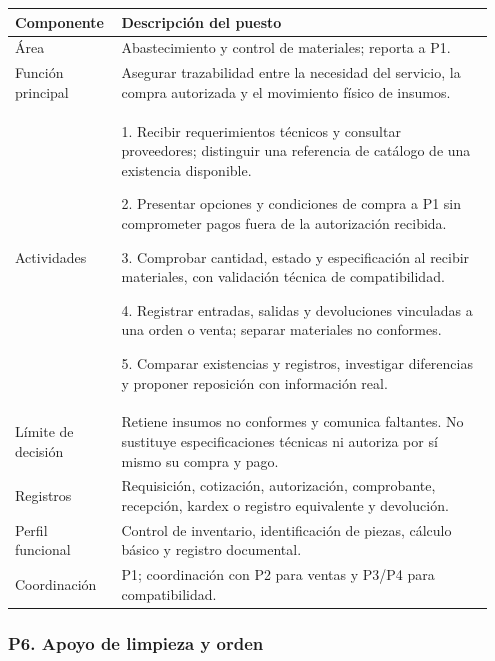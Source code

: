 {\begin{minipage}{\linewidth}
{\small\renewcommand{\arraystretch}{1.15}\begin{tabular}{@{}p{0.20\linewidth}p{0.75\linewidth}@{}}\toprule
\textbf{Componente} & \textbf{Descripción del puesto} \\ \midrule
Área & Abastecimiento y control de materiales; reporta a P1. \\ \midrule
Función principal & Asegurar trazabilidad entre la necesidad del servicio, la compra autorizada y el movimiento físico de insumos. \\ \midrule
Actividades & 1. Recibir requerimientos técnicos y consultar proveedores; distinguir una referencia de catálogo de una existencia disponible.\par 2. Presentar opciones y condiciones de compra a P1 sin comprometer pagos fuera de la autorización recibida.\par 3. Comprobar cantidad, estado y especificación al recibir materiales, con validación técnica de compatibilidad.\par 4. Registrar entradas, salidas y devoluciones vinculadas a una orden o venta; separar materiales no conformes.\par 5. Comparar existencias y registros, investigar diferencias y proponer reposición con información real. \\ \midrule
Límite de decisión & Retiene insumos no conformes y comunica faltantes. No sustituye especificaciones técnicas ni autoriza por sí mismo su compra y pago. \\ \midrule
Registros & Requisición, cotización, autorización, comprobante, recepción, kardex o registro equivalente y devolución. \\ \midrule
Perfil funcional & Control de inventario, identificación de piezas, cálculo básico y registro documental. \\ \midrule
Coordinación & P1; coordinación con P2 para ventas y P3/P4 para compatibilidad. \\ \midrule
\end{tabular}}\end{minipage}\par\medskip
\par\medskip\noindent\begin{minipage}{\linewidth}\subsubsection*{P6. Apoyo de limpieza y orden}
{\small\renewcommand{\arraystretch}{1.15}\begin{tabular}{@{}p{0.20\linewidth}p{0.75\linewidth}@{}}\toprule

\end{tabular}}
\end{minipage}}
